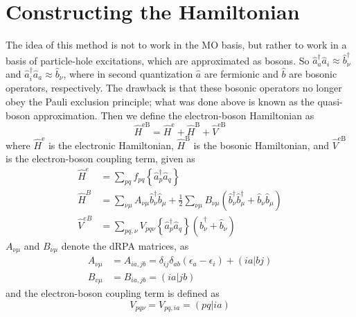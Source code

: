 

\section{Constructing the Hamiltonian}
The idea of this method is not to work in the MO basis, but rather to work in a basis of particle-hole excitations, which are approximated as bosons. So $\hat{a}_a^\dagger \hat{a}_i \approx \hat{b}_\nu^\dag$ and $\hat{a}_i^\dagger \hat{a}_a \approx \hat{b}_\nu$, where in second quantization $\hat{a}$ are fermionic and $\hat{b}$ are bosonic operators, respectively. The drawback is that these bosonic operators no longer obey the Pauli exclusion principle; what was done above is known as the quasi-boson approximation. Then we define the electron-boson Hamiltonian as
\begin{equation}
\hat{H}^{\mathrm{eB}}=\hat{H}^{\mathrm{e}}+\hat{H}^{\mathrm{B}}+\hat{V}^{\mathrm{eB}}
\end{equation}
where $\hat{H}^{\mathrm{e}}$ is the electronic Hamiltonian, $\hat{H}^{\mathrm{B}}$ is the bosonic Hamiltonian, and $\hat{V}^{\mathrm{eB}}$ is the electron-boson coupling term, given as
\begin{align}
\hat{H}^e&=\sum_{p q} f_{p q}\left\{\hat{a}_p^{\dagger} \hat{a}_q\right\} \\
\hat{H}^{B}&=\sum_{\nu \mu} A_{\nu \mu} \hat{b}_\nu^{\dagger} \hat{b}_\mu+\frac{1}{2} \sum_{\nu \mu} B_{\nu \mu}\left(\hat{b}_\nu^{\dagger} \hat{b}_\mu^{\dagger}+\hat{b}_\nu \hat{b}_\mu\right)
\label{b} \\
\hat{V}^{eB}&=\sum_{p q, \nu} V_{p q \nu}\left\{\hat{a}_p^{\dagger} \hat{a}_q\right\}\left(\hat{b}_\nu^{\dagger}+\hat{b}_\nu\right)
\label{eb}
\end{align}
 $A_{\nu \mu}$ and $B_{\nu \mu}$ denote the dRPA matrices, as
\begin{equation}
\begin{split}
A_{\nu \mu}&=A_{i a, j b}=\delta_{i j} \delta_{a b}\left(\epsilon _a-\epsilon _i\right)+(ia|bj) \\
B_{v \mu}&=B_{i a, j b}=(i a | j b)
\end{split}
\end{equation}
and the electron-boson coupling term is defined as
\begin{equation}
V_{p q \nu}=V_{p q, i a}=(p q| i a)
\end{equation}

